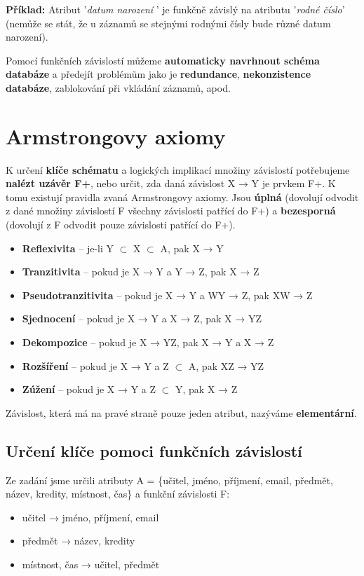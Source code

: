 \textbf{Příklad:} Atribut '\textit{datum narození }' je funkčně závislý na atributu '\textit{rodné číslo}' (nemůže se stát, že u záznamů se stejnými rodnými čísly bude různé datum narození).

Pomocí funkčních závislostí můžeme\textbf{ automaticky navrhnout schéma databáze} a předejít problémům jako je \textbf{redundance}, \textbf{nekonzistence databáze}, zablokování při vkládání záznamů, apod.

\section{Armstrongovy axiomy}
K určení \textbf{klíče schématu} a logických implikací množiny závislostí potřebujeme \textbf{nalézt uzávěr F+}, nebo určit, zda daná závislost X → Y je prvkem F+.  K tomu existují pravidla zvaná Armstrongovy axiomy. Jsou \textbf{úplná} (dovolují odvodit z dané množiny závislostí F všechny závislosti patřící do F+) a \textbf{bezesporná} (dovolují z F odvodit pouze závislosti patřící do F+).
\begin{itemize}
    \item \textbf{Reflexivita} -- je-li Y $\subset$ X $\subset$ A, pak X → Y
    \item \textbf{Tranzitivita} -- pokud je X → Y a Y → Z, pak X → Z
    \item \textbf{Pseudotranzitivita} --  pokud je X → Y a WY → Z, pak XW → Z
    \item \textbf{Sjednocení} -- pokud je X → Y a X → Z, pak X  → YZ
    \item \textbf{Dekompozice} -- pokud je X → YZ, pak  X  → Y a X → Z
    \item \textbf{Rozšíření} --  pokud je X → Y a  Z $\subset$ A, pak  XZ  → YZ
    \item \textbf{Zúžení} --  pokud je X → Y a  Z  $\subset$ Y, pak  X → Z
\end{itemize}
Závislost, která má na pravé straně pouze jeden atribut, nazýváme \textbf{elementární}.

\subsection{Určení klíče pomoci funkčních závislostí}
Ze zadání jsme určili atributy A = \{učitel, jméno, příjmení, email, předmět, název, kredity, místnost, čas\} a funkční závislosti F:
\begin{itemize}
    \item učitel → jméno, příjmení, email
    \item předmět → název, kredity
    \item místnost, čas → učitel, předmět
\end{itemize}

